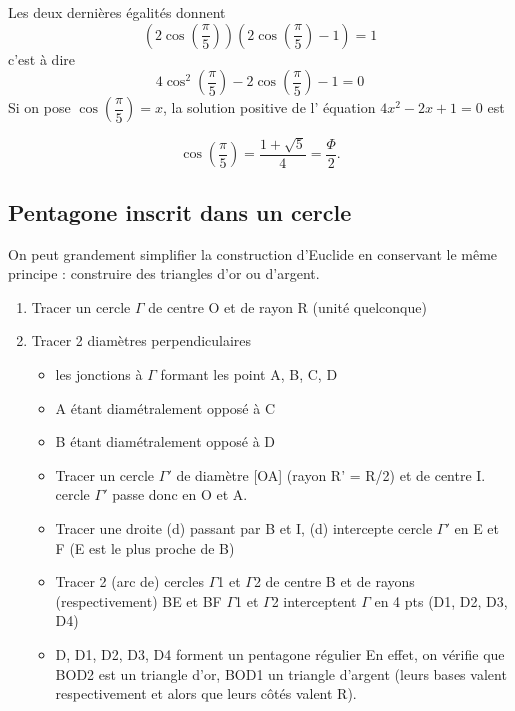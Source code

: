 \documentclass[]{scrartcl}
\begin{document}
Les deux dernières égalités donnent 
\[\left( 2\cos\left(\frac{\pi}{5}\right)\right)\left(2\cos\left(\frac{\pi}{5}\right) -1\right) =1 \]
 c'est à dire 
\[
  4 \cos^2\left(\frac{\pi}{5}\right) - 2 \cos\left(\frac{\pi}{5}\right) - 1 = 0
\]
Si on pose $\cos\left(\dfrac{\pi}{5} \right)=x $, la solution positive de l' équation $4x^2-2x+1=0$ est 

\[\cos\left(\dfrac{\pi}{5} \right)=\dfrac{1 +\sqrt{5}}{4}=\dfrac{\Phi}{2}   .\]       

\newpage   
\subsection{Pentagone inscrit dans un cercle}

On peut grandement simplifier la construction d'Euclide en conservant le même principe : construire des triangles d'or ou d'argent.

\begin{enumerate}
  
  \item Tracer un cercle $\Gamma$ de centre O et de rayon R (unité quelconque)
  \item Tracer 2 diamètres perpendiculaires 
 \begin{itemize}
 \item  les jonctions à $\Gamma$ formant les point A, B, C, D
 \item A étant diamétralement opposé à C
 \item B étant diamétralement opposé à D 
 \item Tracer un cercle $\Gamma'$ de diamètre [OA] (rayon R' = R/2) et de centre I. cercle $\Gamma'$  passe donc en O et A.
 \item   Tracer une droite (d) passant par B et I, 
   (d) intercepte cercle $\Gamma'$  en E et F (E est le plus proche de B)
 \item   Tracer 2 (arc de) cercles $\Gamma$1 et $\Gamma$2 de centre B et de rayons (respectivement) BE et BF
   $\Gamma$1 et $\Gamma$2 interceptent $\Gamma$ en 4 pts (D1, D2, D3, D4)
 \item   D, D1, D2, D3, D4 forment un pentagone régulier
   En effet, on vérifie que BOD2 est un triangle d'or, BOD1 un triangle d'argent (leurs bases valent respectivement  et  alors que leurs côtés valent R).
 \end{itemize}

\end{enumerate}
\end{document}
